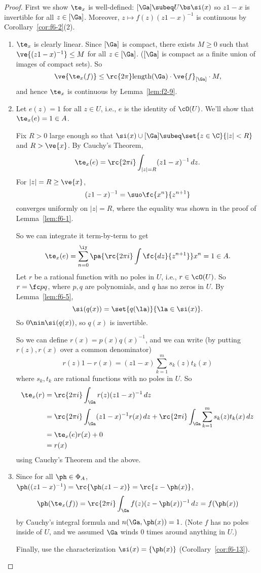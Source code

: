 \begin{proof}
First we show $\te_x$ is well-defined: $[\Ga]\subeq U\bs \si(x)$ so $z1-x$ is invertible for all $z\in [\Ga]$. Moreover, $z\mapsto f(z)(z1-x)^{-1}$ is continuous by Corollary~\ref{cor:f6-2}(2).

\begin{enumerate}
\item
$\te_x$ is clearly linear. Since $[\Ga]$ is compact, there exists $M\ge0$ such that $\ve{(z1-x)^{-1}}\le M$ for all $z\in [\Ga]$. ($[\Ga]$ is compact as a finite union of images of compact sets). So
\[
\ve{\te_x(f)}\le \rc{2\pi}\text{length}(\Ga)\cdot \ve{f}_{[\Ga]}\cdot M,
\]
and hence $\te_x$ is continuous by Lemma~\ref{lem:f2-9}.
\item
Let $e(z)=1$ for all $z\in U$, i.e., $e$ is the identity of $\cO(U)$. We'll show that $\te_x(e)=1\in A$. 

Fix $R>0$ large enough so that $\si(x)\cup [\Ga]\subeq \set{z\in \C}{|z|<R}$ and $R>\ve{x}$.  By Cauchy's Theorem, \[\te_x(e)=\rc{2\pi i}\int_{|z|=R} (z1-x)^{-1} \,dz.\]
For $|z|=R\ge\ve{x}$, \[(z1-x)^{-1}=\suo \fc{x^n}{z^{n+1}}\] converges uniformly on $|z|=R$, where the equality was shown in the proof of Lemma~\ref{lem:f6-1}.

So we can integrate it term-by-term to get 
\[
\te_x(e)=\sum_{n=0}^{\iy}\pa{\rc{2\pi i}\int\fc{dz}{z^{n+1}}}x^n=1\in A.
\]
Let $r$ be a rational function with no poles in $U$, i.e., $r\in \cO(U)$. So $r=\fc pq$, where $p,q$ are polynomials, and $q$ has no zeros in $U$. By Lemma~\ref{lem:f6-5}, 
\[
\si(q(x))=\set{q(\la)}{\la\in \si(x)}.
\]
So $0\nin \si(q(x))$, so $q(x)$ is invertible.

So we can define $r(x)=p(x)q(x)^{-1}$, and we can write (by putting $r(z),r(x)$ over a common denominator)
\[
r(z)1-r(x)=(z1-x)\sum_{k=1}^m s_k(z)t_k(x)
\]
where $s_k,t_k$ are rational functions with no poles in $U$. So
\begin{align*}
\te_x(r)&= \rc{2\pi i}\int_{\Ga} r(z)(z1-x)^{-1} \,dz\\
&=\rc{2\pi i}\int_{\Ga} (z1-x)^{-1} r(x)\,dz+\rc{2\pi i}\int_{\Ga} \sum_{k=1}^m s_k(z)t_k(x)\,dz\\
&=\te_x(e)r(x)+0\\
&=r(x)
\end{align*}
using Cauchy's Theorem and the above.
\item Since for all $\ph\in \Phi_A$, $\ph((z1-x)^{-1})=\rc{\ph(z1-x)}=\rc{z-\ph(x)}$,
\[
\ph(\te_x(f))=\rc{2\pi i}\int_{\Ga}f(z)(z-\ph(x))^{-1}\,dz=f(\ph(x))
\]
by Cauchy's integral formula  and $n(\Ga,\ph(x))=1$. (Note $f$ has no poles inside of $U$, and we assumed $\Ga$ winds 0 times around anything in $U$.)

Finally, use the characterization $\si(x)=\{\ph(x)\}$ (Corollary~\ref{cor:f6-13}).
\end{enumerate}
\end{proof}
